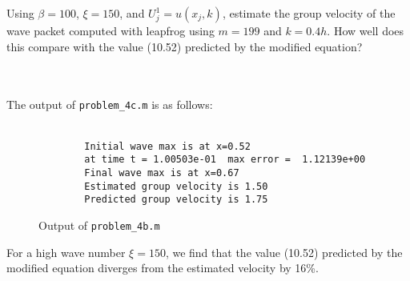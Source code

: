 Using $\beta = 100$, $\xi = 150$, and $U_j^1 = u(x_j, k)$, estimate the group velocity of the wave packet computed with
leapfrog using $m = 199$ and $k = 0.4h$. How well does this compare with the value (10.52) predicted by the modified
equation?

\begin{solution}\ \\\\
    The output of \texttt{problem\_4c.m} is as follows: \ \\\\

    \begin{figure}[h]
        \begin{verbatim}
        Initial wave max is at x=0.52
        at time t = 1.00503e-01  max error =  1.12139e+00
        Final wave max is at x=0.67
        Estimated group velocity is 1.50
        Predicted group velocity is 1.75
        \end{verbatim}
        \caption{Output of \texttt{problem\_4b.m}}
    \end{figure}

    For a high wave number $\xi=150$, we find that the value (10.52) predicted by the modified equation diverges from 
    the estimated velocity by 16\%.
    \ \\
\end{solution}